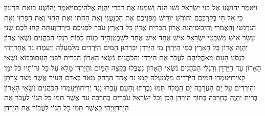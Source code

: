 \documentclass[../main/main.tex]{subfiles}
\begin{document}
\begin{multicols*}{\ncols}
וַיֹּאמֶר יְהוֹשֻׁעַ אֶל בְּנֵי יִשְׂרָאֵל גֹּשׁוּ הֵנָּה וְשִׁמְעוּ אֶת דִּבְרֵי יַהְוֶה אֱלֹהֵיכֶם\PreVerseSpace{}וַיֹּאמֶר יְהוֹשֻׁעַ בְּזֹאת תֵּדְעוּן כִּי אֵל חַי בְּקִרְבְּכֶם וְהוֹרֵשׁ יוֹרִישׁ מִפְּנֵיכֶם אֶת הַכְּנַעֲנִי וְאֶת הַחִתִּי וְאֶת הַחִוִּי וְאֶת הַפְּרִזִּי וְאֶת הַגִּרְגָּשִׁי וְהָאֱמֹרִי וְהַיְבוּסִי\PreVerseSpace{}הִנֵּה אֲרוֹן הַבְּרִית אֲדוֹן כָּל הָאָרֶץ עֹבֵר לִפְנֵיכֶם בַּיַּרְדֵּן\PreVerseSpace{}וְעַתָּה קְחוּ לָכֶם שְׁנֵי עָשָׂר אִישׁ מִשִּׁבְטֵי יִשְׂרָאֵל אִישׁ אֶחָד אִישׁ אֶחָד לַשָּׁבֶט\PreVerseSpace{}וְהָיָה כְּנוֹחַ כַּפּוֹת רַגְלֵי הַכֹּהֲנִים נֹשְׂאֵי אֲרוֹן יַהְוֶה אֲדוֹן כָּל הָאָרֶץ בְּמֵי הַיַּרְדֵּן מֵי הַיַּרְדֵּן יִכָּרֵתוּן הַמַּיִם הַיֹּרְדִים מִלְמָעְלָה וְיַעַמְדוּ נֵד אֶחָד\PreVerseSpace{}וַיְהִי בִּנְסֹעַ הָעָם מֵאָהֳלֵיהֶם לַעֲבֹר אֶת הַיַּרְדֵּן וְהַכֹּהֲנִים נֹשְׂאֵי הָאָרוֹן הַבְּרִית לִפְנֵי הָעָם\PreVerseSpace{}וּכְבוֹא נֹשְׂאֵי הָאָרוֹן עַד הַיַּרְדֵּן וְרַגְלֵי הַכֹּהֲנִים נֹשְׂאֵי הָאָרוֹן נִטְבְּלוּ בִּקְצֵה הַמָּיִם וְהַיַּרְדֵּן מָלֵא עַל כָּל גְּדוֹתָיו כֹּל יְמֵי קָצִיר\PreVerseSpace{}וַיַּעַמְדוּ הַמַּיִם הַיֹּרְדִים מִלְמַעְלָה קָמוּ נֵד אֶחָד הַרְחֵק מְאֹד בְּאָדָם הָעִיר אֲשֶׁר מִצַּד צָרְתָן וְהַיֹּרְדִים עַל יָם הָעֲרָבָה יָם הַמֶּלַח תַּמּוּ נִכְרָתוּ וְהָעָם עָבְרוּ נֶגֶד יְרִיחוֹ\PreVerseSpace{}וַיַּעַמְדוּ הַכֹּהֲנִים נֹשְׂאֵי הָאָרוֹן בְּרִית יַהְוֶה בֶּחָרָבָה בְּתוֹךְ הַיַּרְדֵּן הָכֵן וְכָל יִשְׂרָאֵל עֹבְרִים בֶּחָרָבָה עַד אֲשֶׁר תַּמּוּ כָּל הַגּוֹי לַעֲבֹר אֶת הַיַּרְדֵּן\PreChapterSpace{}וַיְהִי כַּאֲשֶׁר תַּמּוּ כָל הַגּוֹי לַעֲבוֹר אֶת הַיַּרְדֵּן\OpenSection{}\par

\end{multicols*}
\end{document}
